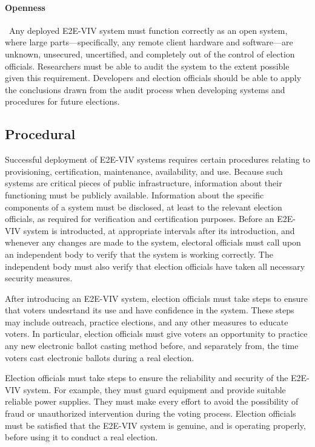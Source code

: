 \paragraph{Openness} \ Any deployed E2E-VIV system must function
correctly as an open system, where large parts---specifically, any
remote client hardware and software---are unknown, unsecured,
uncertified, and completely out of the control of election
officials. Researchers must be able to audit the system to the extent
possible given this requirement. Developers and election officials
should be able to apply the conclusions drawn from the audit process
when developing systems and procedures for future elections.

\subsection{Procedural}

Successful deployment of E2E-VIV systems requires certain procedures
relating to provisioning, certification, maintenance, availability,
and use. Because such systems are critical pieces of public
infrastructure, information about their functioning must be publicly
available. Information about the specific components of a system must
be disclosed, at least to the relevant election officials, as required
for verification and certification purposes. Before an E2E-VIV system
is introducted, at appropriate intervals after its introduction, and
whenever any changes are made to the system, electoral officials must
call upon an independent body to verify that the system is working
correctly. The independent body must also verify that election
officials have taken all necessary security measures.

After introducing an E2E-VIV system, election officials must take
steps to ensure that voters undesrtand its use and have confidence in
the system. These steps may include outreach, practice elections, and
any other measures to educate voters. In particular, election
officials must give voters an opportunity to practice any new
electronic ballot casting method before, and separately from, the time
voters cast electronic ballots during a real election.

Election officials must take steps to ensure the reliability and
security of the E2E-VIV system. For example, they must guard equipment
and provide suitable reliable power supplies. They must make every
effort to avoid the possibility of fraud or unauthorized intervention
during the voting process. Election officials must be satisfied that
the E2E-VIV system is genuine, and is operating properly, before using
it to conduct a real election.

